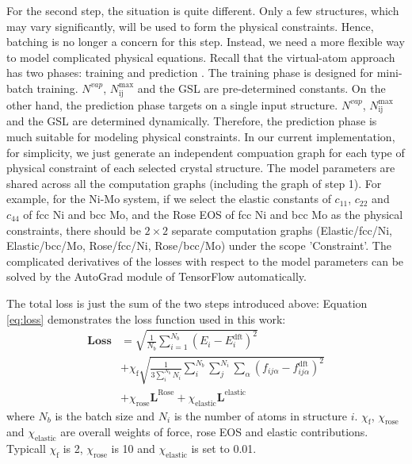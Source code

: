 \documentclass[final,3p,times]{elsarticle}
\begin{document}
For the second step, the situation is quite different. Only a few structures, 
which may vary significantly, will be used to form the physical constraints. 
Hence, batching is no longer a concern for this step. Instead, we need a more 
flexible way to model complicated physical equations. 
Recall that the virtual-atom approach has two phases: training and prediction 
\cite{TensorAlloy}. The training phase is designed for mini-batch training. 
$N^{vap}$, $N^{\mathrm{max}}_{\mathrm{ij}}$ and the GSL are pre-determined 
constants. On the other hand, the prediction phase targets on a single input 
structure. $N^{vap}$, $N^{\mathrm{max}}_{\mathrm{ij}}$ and the GSL are 
determined dynamically. Therefore, the prediction phase is much suitable for 
modeling physical constraints. In our current implementation, for simplicity, we 
just generate an independent compuation graph for each type of physical 
constraint of each selected crystal structure. The model parameters are shared 
across all the computation graphs (including the graph of step 1). For 
example, for the Ni-Mo system, if we select the elastic constants of $c_{11}$, 
$c_{22}$ and $c_{44}$ of fcc Ni and bcc Mo, and the Rose EOS of fcc Ni and bcc 
Mo as the physical constraints, there should be $2 \times 2$ separate 
computation graphs (\textrm{Elastic/fcc/Ni, Elastic/bcc/Mo, Rose/fcc/Ni, 
Rose/bcc/Mo}) under the scope 'Constraint'. The complicated derivatives of the 
losses with respect to the model parameters can be solved by the AutoGrad module 
of TensorFlow automatically.

The total loss is just the sum of the two steps introduced above:
Equation \ref{eq:loss} demonstrates the loss function used in 
this work:
\begin{align}
\label{eq:loss}
\mathbf{Loss} & = \sqrt{\frac{1}{N_{b}}\sum_{i=1}^{N_{b}}{\left(
    E_{i} - E_{i}^{\mathrm{dft}}
\right)^2}} \nonumber \\
& + \chi_{\mathrm{f}}\sqrt{
    \frac{1}{3\sum_{i}^{N_{b}}{N_i}}\sum_{i}^{N_b}{\sum_{j}^{N_i}{
        \sum_{\alpha}{
            \left(f_{ij\alpha} - f_{ij\alpha}^{\mathrm{dft}}\right)^2
        }
    }}
} \nonumber \\
& + \chi_{\mathrm{rose}}\mathbf{L}^{\mathrm{Rose}} 
+ \chi_{\mathrm{elastic}}\mathbf{L}^{\mathrm{elastic}}
\end{align} 
where $N_{b}$ is the batch size and $N_i$ is the number of atoms in structure 
$i$. $\chi_{\mathrm{f}}$, $\chi_{\mathrm{rose}}$ and $\chi_{\mathrm{elastic}}$ 
are overall weights of force, rose EOS and elastic contributions. Typicall 
$\chi_{\mathrm{f}}$ is 2, $\chi_{\mathrm{rose}}$ is 10 and 
$\chi_{\mathrm{elastic}}$ is set to 0.01.
\end{document}
